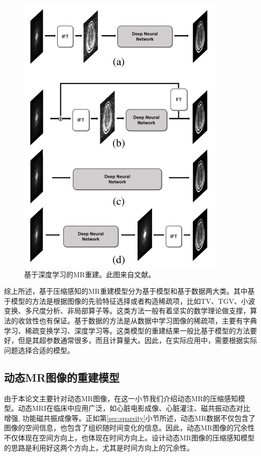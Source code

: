 \begin{figure}[htbp]
\centering
\includegraphics[width=0.9\textwidth]{img/intro/deepmri.png}
\caption{基于深度学习的MR重建。此图来自文献\cite{ye2019compressed}。}
\label{fig:deepmri}
\end{figure}

综上所述，基于压缩感知的MR重建模型分为基于模型和基于数据两大类。其中基于模型的方法是根据图像的先验特征选择或者构造稀疏项，比如TV、TGV、小波变换、多尺度分析、非局部算子等。这类方法一般有着坚实的数学理论做支撑，算法的收敛性也有保证。基于数据的方法是从数据中学习图像的稀疏项，主要有字典学习、稀疏变换学习、深度学习等。这类模型的重建结果一般比基于模型的方法要好，但是其超参数通常很多，而且计算量大。因此，在实际应用中，需要根据实际问题选择合适的模型。

\subsection{动态MR图像的重建模型}
\label{sec:dmri}
由于本论文主要针对动态MR图像，在这一小节我们介绍动态MR的压缩感知模型。动态MRI在临床中应用广泛，如心脏电影成像、心脏灌注、磁共振动态对比增强, 功能磁共振成像等。正如第\ref{sec:sparsity}小节所述，动态MR数据不仅包含了图像的空间信息，也包含了组织随时间变化的信息。因此，动态MR图像的冗余性不仅体现在空间方向上，也体现在时间方向上。设计动态MR图像的压缩感知模型的思路是利用好这两个方向上，尤其是时间方向上的冗余性。

